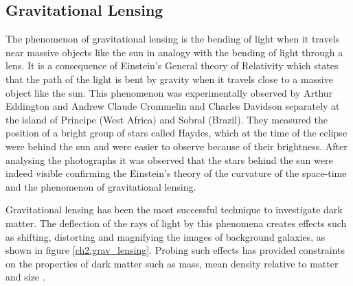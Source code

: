 
\subsection{Gravitational Lensing}
The phenomenon of gravitational lensing is the bending of light when it travels near massive objects like the sun in analogy with the bending of light through a lens. It is a consequence of Einstein's General theory of Relativity \citep{ch2:relativity} which states that the path of the light is bent by gravity when it travels close to a massive object like the sun. This phenomenon was experimentally observed by Arthur Eddington and Andrew Claude Crommelin and Charles Davidson separately at the island of Principe (West Africa) and Sobral (Brazil). They measured the position of a bright group of stars called Haydes, which at the time of the eclipse were behind the sun and were easier to observe because of their brightness. After analysing the photographs it was observed that the stars behind the sun were indeed visible confirming the Einstein's theory of the curvature of the space-time and the phenomenon of gravitational lensing.

Gravitational lensing has been the most successful technique to investigate dark matter. The deflection of the rays of light by this phenomena creates effects such as shifting, distorting and magnifying the images of background galaxies, as shown in figure \ref{ch2:grav_lensing}. Probing such effects has provided constraints on the properties of dark matter such as mass, mean density relative to matter and size \citep{ch2:lensing}. 

